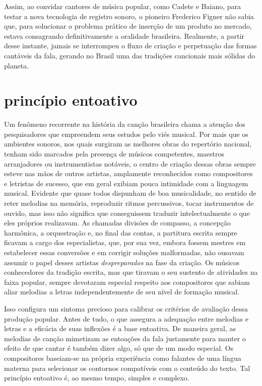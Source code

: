 Assim, ao convidar cantores de música popular, como Cadete e Baiano,
para testar a nova tecnologia de registro sonoro, o pioneiro Frederico
Figner não sabia que, para solucionar o problema prático de inserção de
um produto no mercado, estava consagrando definitivamente a oralidade
brasileira. Realmente, a partir desse instante, jamais se interrompeu o
fluxo de criação e perpetuação das formas cantáveis da fala, gerando no
Brasil uma das tradições cancionais mais sólidas do planeta.

\section{princípio entoativo}

Um fenômeno recorrente na história da canção brasileira chama a atenção
dos pesquisadores que empreendem seus estudos pelo viés musical. Por
mais que os ambientes sonoros, nos quais surgiram as melhores obras do
repertório nacional, tenham sido marcados pela presença de músicos
competentes, maestros arranjadores ou instrumentistas notáveis, o centro
de criação dessas obras sempre esteve nas mãos de outros artistas,
amplamente reconhecidos como compositores e letristas de sucesso, que em
geral exibiam pouca intimidade com a linguagem musical. Evidente que
quase todos dispunham de boa musicalidade, no sentido de reter melodias
na memória, reproduzir ritmos percussivos, tocar instrumentos de ouvido,
mas isso não significa que conseguissem traduzir intelectualmente o que
eles próprios realizavam. As chamadas divisões de compasso, a concepção
harmônica, a orquestração e, no final das contas, a partitura escrita
sempre ficavam a cargo dos especialistas, que, por sua vez, embora
fossem mestres em estabelecer essas conversões e em corrigir soluções
malformadas, não ousavam assumir o papel desses artistas
\textit{despreparados} na fase da criação. Os músicos conhecedores da
tradição escrita, mas que tiravam o seu sustento de atividades na faixa
popular, sempre devotaram especial respeito aos compositores que sabiam
aliar melodias a letras independentemente de seu nível de formação
musical.

Isso configura um sintoma precioso para calibrar os critérios de
avaliação dessa produção popular. Antes de tudo, o que assegura a
adequação entre melodias e letras e a eficácia de suas inflexões é a
base entoativa. De maneira geral, as melodias de canção mimetizam as
entoações da fala justamente para manter o efeito de que cantar é também
dizer algo, só que de um modo especial. Os compositores baseiam-se na
própria experiência como falantes de uma língua materna para selecionar
os contornos compatíveis com o conteúdo do texto. Tal princípio
entoativo é, ao mesmo tempo, simples e complexo.

